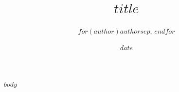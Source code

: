 \documentclass[11pt]{article}
\title{\vspace{-1.5em}$title$}
\author{$for(author)$$author$$sep$, $endfor$}
\date{\normalsize $date$}
\date{}
\begin{document}
\maketitle
\thispagestyle{fancy}

$body$
\end{document}
